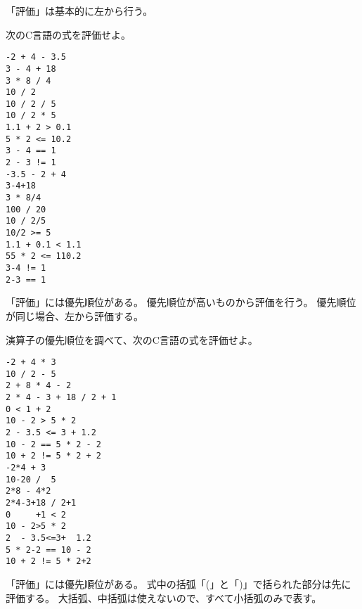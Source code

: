 \documentclass[12pt,a4j]{jarticle}
\newcounter{toi}
\def\toi{%
\bigskip\bigskip\noindent
\addtocounter{toi}{1}
\shadowbox{\bfseries\large 問\thetoi}
\nopagebreak[4]\bigskip\nopagebreak[4]
}
\begin{document}



\toi

「評価」は基本的に左から行う。


次のC言語の式を評価せよ。

\begin{multicols}{2}
\begin{verbatim}
-2 + 4 - 3.5
3 - 4 + 18
3 * 8 / 4
10 / 2
10 / 2 / 5
10 / 2 * 5
1.1 + 2 > 0.1
5 * 2 <= 10.2
3 - 4 == 1
2 - 3 != 1
-3.5 - 2 + 4
3-4+18
3 * 8/4
100 / 20
10 / 2/5
10/2 >= 5
1.1 + 0.1 < 1.1
55 * 2 <= 110.2
3-4 != 1
2-3 == 1
\end{verbatim}
\end{multicols}





\toi

「評価」には優先順位がある。
優先順位が高いものから評価を行う。
優先順位が同じ場合、左から評価する。


演算子の優先順位を調べて、次のC言語の式を評価せよ。

\begin{multicols}{2}
\begin{verbatim}
-2 + 4 * 3
10 / 2 - 5
2 + 8 * 4 - 2
2 * 4 - 3 + 18 / 2 + 1
0 < 1 + 2 
10 - 2 > 5 * 2
2 - 3.5 <= 3 + 1.2
10 - 2 == 5 * 2 - 2
10 + 2 != 5 * 2 + 2
-2*4 + 3
10-20 /  5
2*8 - 4*2
2*4-3+18 / 2+1
0     +1 < 2 
10 - 2>5 * 2
2  - 3.5<=3+  1.2
5 * 2-2 == 10 - 2
10 + 2 != 5 * 2+2
\end{verbatim}
\end{multicols}







\toi


「評価」には優先順位がある。
式中の括弧「{\ttfamily (}」と「{\ttfamily )}」で括られた部分は先に評価する。
大括弧、中括弧は使えないので、すべて小括弧のみで表す。
\end{document}

